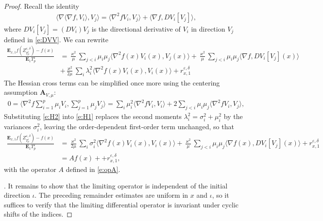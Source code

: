 \documentclass[10pt,a4paper]{amsart}
\newcommand{\E}{\mathbf{E}}
\newcommand{\ba}{\begin{equation}\begin{aligned}}
\newcommand{\e}{\varepsilon}
\newcommand{\ea}{\end{aligned}\end{equation}}
\begin{document}
\begin{proof}
Recall the identity
\ba
\langle \nabla \langle \nabla f,  V_i\rangle, V_j \rangle
= \langle \nabla^2 f  V_i , V_j \rangle + \langle \nabla f,  D V_i[V_j] \rangle,
\ea
where $D V_i[V_j]=(DV_i)V_j$ is the directional derivative of $V_i$ in direction $V_j$ defined in \eqref{e:DVV}.
We can rewrite
\ba
\label{e:H1}
\frac{\E_{x,1}f(Z^{\e,\delta}_{T_p^\e}) -f(x)}{\E_1 T^\e_p}
&= \frac{\varkappa^2}{\mu} \sum_{j<i} \mu_i\mu_j \langle \nabla^2 f(x)  V_i(x) , V_j(x) \rangle
+ \frac{\varkappa^2}{\mu} \sum_{j<i} \mu_i\mu_j  \langle \nabla f,  D V_i[V_j](x) \rangle\\
&+\frac{\varkappa^2}{2\mu} \sum_{i}  \lambda_i^2 \langle \nabla^2 f(x)V_i(x), V_i(x)\rangle
+r^{\e,\delta}_{x,1}
\ea
The Hessian cross terms can be simplified once more using the centering assumption $\mathbf{A}_{V,\mu}$:
\ba
\label{e:H2}
0=\Big\langle \nabla^2 f \sum_{i=1}^{p} \mu_i V_i,  \sum_{j=1}^{p} \mu_j V_j\Big\rangle
=\sum_{i} \mu_i^2 \langle \nabla^2 f V_i, V_i\rangle
+ 2 \sum_{j<i} \mu_i\mu_j \langle \nabla^2 f V_i, V_j\rangle,
\ea
Substituting \eqref{e:H2} into \eqref{e:H1} replaces the second moments $\lambda_i^2=\sigma_i^2+\mu_i^2$ by the variances $\sigma_i^2$,
leaving the order-dependent first-order term unchanged, so that
\ba
\label{e:AA}
\frac{\E_{x,1}f(Z^{\e,\delta}_{T_p^\e}) -f(x)}{\E_1 T^\e_p}
&=
\frac{\varkappa^2}{2\mu} \sum_i  \sigma_{i}^2
\langle \nabla^2 f(x)V_i(x), V_i(x)\rangle
+\frac{\varkappa^2}{\mu} \sum_{j<i}
\mu_i\mu_j  \langle \nabla f(x),  D V_i[V_j](x) \rangle
+r^{\e,\delta}_{x,1}\\
&= Af(x) + +r^{\e,\delta}_{x,1},
\ea
with the operator $A$ defined in \eqref{e:opA}.

\smallskip
{}.
It remains to show that the limiting operator is independent of the initial direction $\iota$.
The preceding remainder estimates are uniform in $x$ and $\iota$,
so it suffices to verify that the limiting differential operator is invariant under cyclic shifts of the indices.


\end{proof}
\end{document}

